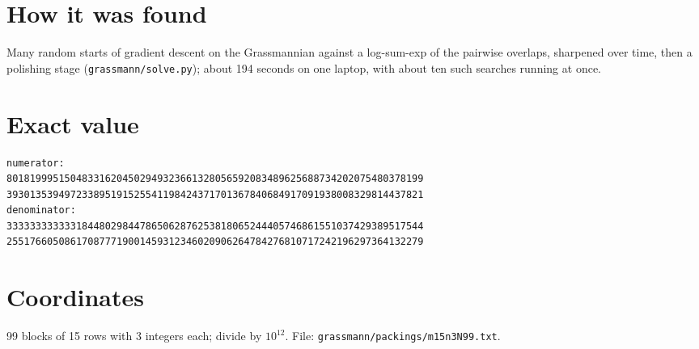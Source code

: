 \documentclass[11pt,a4paper]{article}
\begin{document}
\section{How it was found}
Many random starts of gradient descent on the Grassmannian against a log-sum-exp of the pairwise overlaps, sharpened over time, then a polishing stage (\texttt{grassmann/solve.py}); about 194 seconds on one laptop, with about ten such searches running at once.


\appendix
\section{Exact value}
{\small
\begin{verbatim}
numerator:
801819995150483316204502949323661328056592083489625688734202075480378199
393013539497233895191525541198424371701367840684917091938008329814437821
denominator:
333333333333184480298447865062876253818065244405746861551037429389517544
255176605086170877719001459312346020906264784276810717242196297364132279
\end{verbatim}}

\section{Coordinates}
99 blocks of 15 rows with 3 integers each; divide by $10^{12}$. File: \texttt{grassmann/packings/m15n3N99.txt}.
{\tiny
\begin{multicols}{3}
\end{multicols}}
\end{document}
